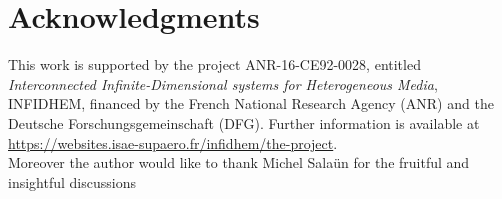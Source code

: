 \documentclass[11pt]{article}
\begin{document}
	
	
	\section*{Acknowledgments}
	This work is supported by the project ANR-16-CE92-0028,
	entitled {\em Interconnected Infinite-Dimensional systems for Heterogeneous
		Media}, INFIDHEM, financed by the French National Research Agency (ANR) and the Deutsche Forschungsgemeinschaft (DFG). Further information is available at {\url{https://websites.isae-supaero.fr/infidhem/the-project}}. \\
	Moreover the author would like to thank Michel Sala\"un for the fruitful and insightful discussions
	
	
	 
	
	
\end{document}
